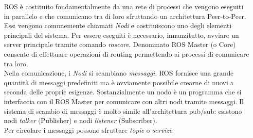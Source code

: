 ROS è costituito fondamentalmente da una rete di processi che vengono eseguiti in parallelo e che comunicano tra di loro sfruttando un architettura Peer-to-Peer.
Essi vengono comunemente chiamati \textit{Nodi} e costituiscono uno degli elementi principali del sistema.
Per essere eseguiti è necessario, innanzitutto, avviare un server principale tramite comando \textit{roscore}. Denominato ROS Master (o Core) consente di effettuare operazioni di routing permettendo ai processi di comunicare tra loro.\\
Nella comunicazione, i \textit{Nodi} si scambiano \textit{messaggi}. ROS fornisce una grande quantità di messaggi predefiniti ma è ovviamente possibile crearne di nuovi a seconda delle proprie esigenze.
Sostanzialmente un nodo è un programma che si interfaccia con il ROS Master per comunicare con altri nodi tramite messaggi.
Il sistema di scambio di messaggi è molto simile all’architettura pub/sub: esistono nodi \textit{talker} (Publisher) e nodi \textit{listener} (Subscriber).\\ 
Per circolare i messaggi possono sfruttare \textit{topic} o \textit{servizi}:
